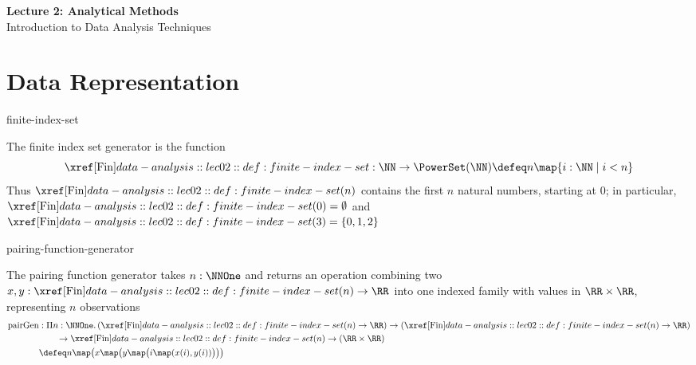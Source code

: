 \documentclass[12pt]{article}
\numberwithin{figure}{section}
\begin{document}
\begin{center}
  {\LARGE\bfseries Lecture 2: Analytical Methods}\\[0.25em]
  {\large Introduction to Data Analysis Techniques}\\[0.15em]
\end{center}

\section{Data Representation}

\begin{dfn}{finite-index-set}
  \leavevmode\par
  \begingroup\color{notesmissingprereq}
  \par\smallskip
  The finite index set generator is the function
  \[
    \Fin:\NN\to\PowerSet(\NN)
      \defeq n\map\{i:\NN\mid i<n\}
  \]
  Thus $\Fin(n)$ contains the first $n$ natural numbers, starting at $0$;
  in particular, $\Fin(0)=\emptyset$ and $\Fin(3)=\{0,1,2\}$
    \par\smallskip{}
  \par\endgroup
\end{dfn}

\begin{dfn}{pairing-function-generator}
  \leavevmode\par
  \begingroup\color{notesmissingprereq}
  \par\smallskip
  The pairing function generator takes $n:\NNOne$ and returns an operation
  combining two 
  $x,y:\Fin(n)\to\RR$ into one indexed family with values in
  $\RR\times\RR$, representing $n$ observations
  \[
    \begin{aligned}
      \mathrm{pairGen} &: \Pi n:\NNOne.\,
        (\Fin(n)\to\RR)\to(\Fin(n)\to\RR) \\
      &\qquad\to\Fin(n)\to(\RR\times\RR) \\
      &\defeq n\map\bigl(x\map\bigl(y\map\bigl(i\map(x(i),y(i))\bigr)\bigr)\bigr)
    \end{aligned}
  \]
    \par\smallskip{}
  \par\endgroup
\end{dfn}
\end{document}
